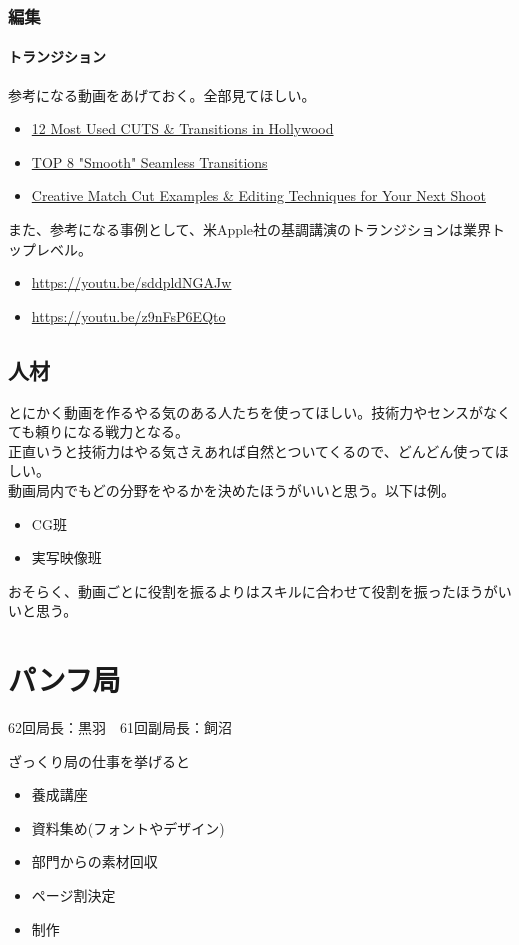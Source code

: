 \documentclass[a4paper]{ltjsreport}
\newcommand{\link}[2]{\href{#2}{#1}}
\newcommand{\Chapter}[1]{\chapter{#1}\thispagestyle{fancy}}
\begin{document}
\subsection{編集}
\subsubsection{トランジション}
参考になる動画をあげておく。全部見てほしい。
\begin{itemize}
  \item \link{12 Most Used CUTS \& Transitions in Hollywood}{https://youtu.be/VVTZNg-IgGI}
  \item \link{TOP 8 "Smooth" Seamless Transitions}{https://youtu.be/t5k7feqZUD0}
  \item \link{Creative Match Cut Examples \& Editing Techniques for Your Next Shoot}{https://youtu.be/ptXlYulVAsM}
\end{itemize}
また、参考になる事例として、米Apple社の基調講演のトランジションは業界トップレベル。
\begin{itemize}
  \item \url{https://youtu.be/sddpldNGAJw}
  \item \url{https://youtu.be/z9nFsP6EQto}
\end{itemize}
\section{人材}
とにかく動画を作るやる気のある人たちを使ってほしい。技術力やセンスがなくても頼りになる戦力となる。\\
正直いうと技術力はやる気さえあれば自然とついてくるので、どんどん使ってほしい。\\
動画局内でもどの分野をやるかを決めたほうがいいと思う。以下は例。
\begin{itemize}
  \item CG班
  \item 実写映像班
\end{itemize}
おそらく、動画ごとに役割を振るよりはスキルに合わせて役割を振ったほうがいいと思う。

\Chapter{パンフ局}
62回局長：黒羽　61回副局長：飼沼

ざっくり局の仕事を挙げると
\begin{itemize}
  \item 養成講座
  \item 資料集め(フォントやデザイン)
  \item 部門からの素材回収
  \item ページ割決定
  \item 制作
\end{itemize}
\end{document}
